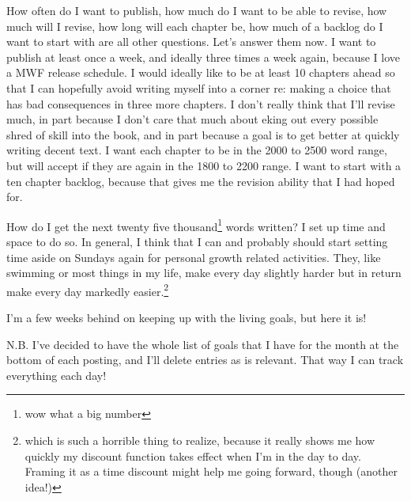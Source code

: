 \documentclass[12pt]{article}[titlepage]
\renewcommand{\,}{\textsuperscript{,}}
\begin{document}
How often do I want to publish, how much do I want to be able to revise, how much will I revise, how long will each chapter be, how much of a backlog do I want to start with are all other questions.  
Let's answer them now.  
I want to publish at least once a week, and ideally three times a week again, because I love a MWF release schedule.  
I would ideally like to be at least 10 chapters ahead so that I can hopefully avoid writing myself into a corner re: making a choice that has bad consequences in three more chapters.  
I don't really think that I'll revise much, in part because I don't care that much about eking out every possible shred of skill into the book, and in part because a goal is to get better at quickly writing decent text.  
I want each chapter to be in the 2000 to 2500 word range, but will accept if they are again in the 1800 to 2200 range.  
I want to start with a ten chapter backlog, because that gives me the revision ability that I had hoped for.

How do I get the next twenty five thousand\footnote{wow what a big number} words written?  
I set up time and space to do so.  
In general, I think that I can and probably should start setting time aside on Sundays again for personal growth related activities.  
They, like swimming or most things in my life, make every day slightly harder but in return make every day markedly easier.\footnote{which is such a horrible thing to realize, because it really shows me how quickly my discount function takes effect when I'm in the day to day. Framing it as a time discount might help me going forward, though (another idea!)}

I'm a few weeks behind on keeping up with the living goals, but here it is!

N.B. I've decided to have the whole list of goals that I have for the month at the bottom of each posting, and I'll delete entries as is relevant. That way I can track everything each day!
\end{document}
